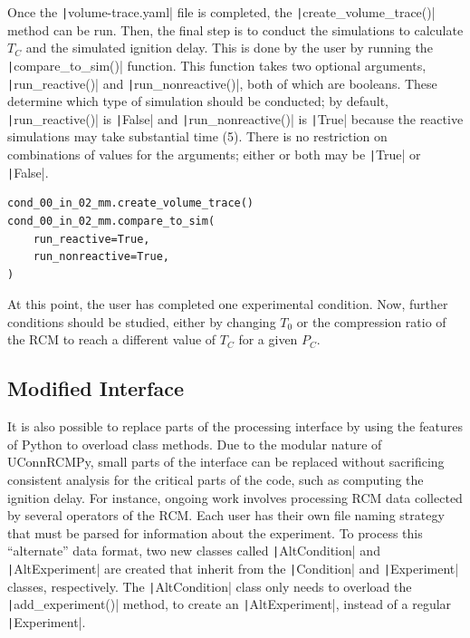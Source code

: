 \documentclass[12pt]{../ussci}
\begin{document}
Once the \texttt|volume-trace.yaml| file is completed, the
\texttt|create_volume_trace()| method can be run. Then, the final step
is to conduct the simulations to calculate \(T_C\) and the simulated
ignition delay. This is done by the user by running the
\texttt|compare_to_sim()| function. This function takes two optional
arguments, \texttt|run_reactive()| and \texttt|run_nonreactive()|,
both of which are booleans. These determine which type of simulation
should be conducted; by default, \texttt|run_reactive()| is
\texttt|False| and \texttt|run_nonreactive()| is \texttt|True| because
the reactive simulations may take substantial time (\SI{5}{\min}).
There is no restriction on combinations of values for the
arguments; either or both may be \texttt|True| or \texttt|False|.

\begin{verbatim}
cond_00_in_02_mm.create_volume_trace()
cond_00_in_02_mm.compare_to_sim(
    run_reactive=True,
    run_nonreactive=True,
)
\end{verbatim}

At this point, the user has completed one experimental condition. Now,
further conditions should be studied, either by changing \(T_0\) or the
compression ratio of the RCM to reach a different value of \(T_C\) for a
given \(P_C\).

\subsection{Modified Interface}\label{modified-interface}

It is also possible to replace parts of the processing interface by
using the features of Python to overload class methods. Due to the
modular nature of UConnRCMPy, small parts of the interface can be
replaced without sacrificing consistent analysis for the critical parts
of the code, such as computing the ignition delay. For instance, ongoing
work involves processing RCM data collected by several operators of the
RCM. Each user has their own file naming strategy that must be parsed
for information about the experiment. To process this ``alternate'' data
format, two new classes called \texttt|AltCondition| and
\texttt|AltExperiment| are created that inherit from the
\texttt|Condition| and \texttt|Experiment| classes, respectively. The
\texttt|AltCondition| class only needs to overload the
\texttt|add\_experiment()| method, to create an \texttt|AltExperiment|,
instead of a regular \texttt|Experiment|.
\end{document}
